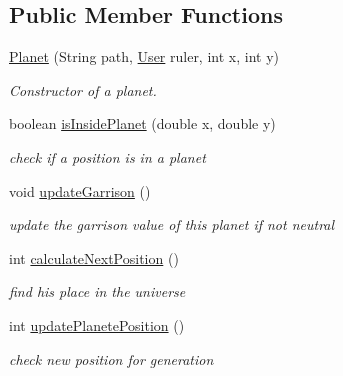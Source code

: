 \subsection*{Public Member Functions}
\begin{DoxyCompactItemize}
\item 
\hyperlink{classfr_1_1groupe40_1_1projet_1_1model_1_1planets_1_1_planet_a7cdf092f3e8443176362cf97ddcd11ae}{Planet} (String path, \hyperlink{classfr_1_1groupe40_1_1projet_1_1client_1_1_user}{User} ruler, int x, int y)
\begin{DoxyCompactList}\small\item\em Constructor of a planet. \end{DoxyCompactList}\item 
boolean \hyperlink{classfr_1_1groupe40_1_1projet_1_1model_1_1planets_1_1_planet_a14c09ad18bf0c963662ee45d0c6f07a1}{is\+Inside\+Planet} (double x, double y)
\begin{DoxyCompactList}\small\item\em check if a position is in a planet \end{DoxyCompactList}\item 
\mbox{\label{classfr_1_1groupe40_1_1projet_1_1model_1_1planets_1_1_planet_a6db5bb259c3c2889b0285b0472fc6a76}} 
void \hyperlink{classfr_1_1groupe40_1_1projet_1_1model_1_1planets_1_1_planet_a6db5bb259c3c2889b0285b0472fc6a76}{update\+Garrison} ()
\begin{DoxyCompactList}\small\item\em update the garrison value of this planet if not neutral \end{DoxyCompactList}\item 
int \hyperlink{classfr_1_1groupe40_1_1projet_1_1model_1_1planets_1_1_planet_a745df6537c22855fc854381c7ad2c029}{calculate\+Next\+Position} ()
\begin{DoxyCompactList}\small\item\em find his place in the universe \end{DoxyCompactList}\item 
int \hyperlink{classfr_1_1groupe40_1_1projet_1_1model_1_1planets_1_1_planet_a55af7887127afab452dec09d5d149d90}{update\+Planete\+Position} ()
\begin{DoxyCompactList}\small\item\em check new position for generation \end{DoxyCompactList}\item 

\end{DoxyCompactItemize}

